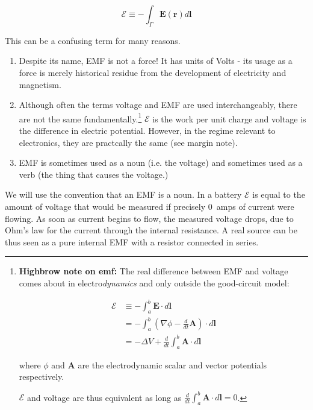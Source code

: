\documentclass{tufte-book}
\begin{document}
\begin{equation}\label{eq:def_emf}
\mathcal{E} \equiv -\int_\Gamma\textbf{E}(\textbf{r})d\textbf{l}
\end{equation}

This can be a confusing term for many reasons.
\begin{enumerate}
\item Despite its name, EMF is not a force! It has units of Volts - its usage as a force is merely historical residue from the development of electricity and magnetism. 
\item Although often the terms voltage and EMF are used interchangeably, there are not the same fundamentally.\footnote{\textbf{Highbrow note on emf:} The real difference between EMF and voltage comes about in electro\textit{dynamics} and only outside the good-circuit model:

\begin{align*}
\mathcal{E} &\equiv -\int_a^b\mathbf{E}\cdot d\mathbf{l} \\ &= -\int_a^b\left(\nabla\phi - \frac{d}{dt}\mathbf{A}\right)\cdot d\mathbf{l} \\
&= -\Delta V + \frac{d}{dt}\int_a^b\mathbf{A}\cdot d\mathbf{l} 
\end{align*}

\noindent where $\phi$ and $\mathbf{A}$ are the electrodynamic scalar and vector potentials respectively. 


\noindent $\mathcal{E}$ and voltage are thus equivalent as long as $\frac{d}{dt}\int_a^b\mathbf{A}\cdot d\mathbf{l}  = 0$.} $\mathcal{E}$ is the work per unit charge and voltage is the difference in electric potential. However, in the regime relevant to electronics, they are practcally the same (see margin note).
\item EMF is sometimes used as a noun (i.e. the voltage) and sometimes used as a verb (the thing that causes the voltage.)
\end{enumerate}

We will use the convention that an EMF is a noun. In a battery $\mathcal{E}$ is equal to the amount of voltage that would be measured if precisely 0~amps of current were flowing. As soon as current begins to flow, the measured voltage drops, due to Ohm's law for the current through the internal resistance. A real source can be thus seen as a pure internal EMF with a resistor connected in series.
\end{document}
